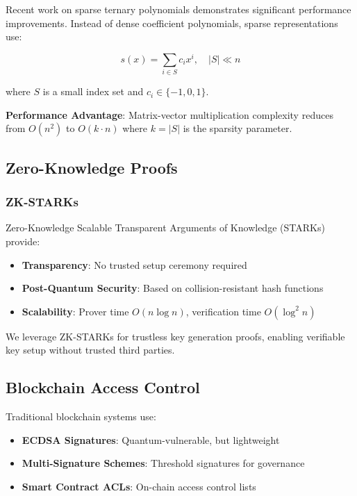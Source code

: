 \documentclass[11pt,a4paper]{article}
\begin{document}
Recent work on sparse ternary polynomials \cite{howgrave2003,ducas2018} demonstrates significant performance improvements. Instead of dense coefficient polynomials, sparse representations use:

$$s(x) = \sum_{i \in S} c_i x^i, \quad |S| \ll n$$

where $S$ is a small index set and $c_i \in \{-1, 0, 1\}$.

\textbf{Performance Advantage}: Matrix-vector multiplication complexity reduces from $O(n^2)$ to $O(k \cdot n)$ where $k = |S|$ is the sparsity parameter.

\subsection{Zero-Knowledge Proofs}

\subsubsection{ZK-STARKs}

Zero-Knowledge Scalable Transparent Arguments of Knowledge (STARKs) \cite{ben2018} provide:
\begin{itemize}
    \item \textbf{Transparency}: No trusted setup ceremony required
    \item \textbf{Post-Quantum Security}: Based on collision-resistant hash functions
    \item \textbf{Scalability}: Prover time $O(n \log n)$, verification time $O(\log^2 n)$
\end{itemize}

We leverage ZK-STARKs for trustless key generation proofs, enabling verifiable key setup without trusted third parties.

\subsection{Blockchain Access Control}

Traditional blockchain systems use:
\begin{itemize}
    \item \textbf{ECDSA Signatures}: Quantum-vulnerable, but lightweight
    \item \textbf{Multi-Signature Schemes}: Threshold signatures for governance
    \item \textbf{Smart Contract ACLs}: On-chain access control lists
\end{itemize}
\end{document}
